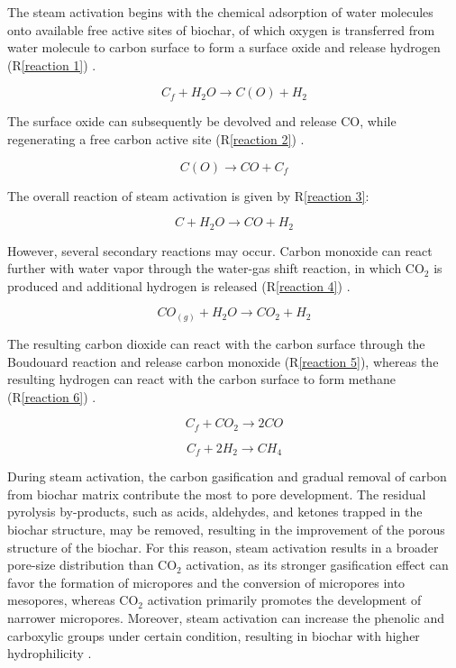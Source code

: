 The steam activation begins with the chemical adsorption of water molecules onto available free active sites of biochar, of which oxygen is transferred from water molecule to carbon surface to form a surface oxide and release hydrogen (R\ref{reaction 1}) \cite{Sajjadi2019}. 

\begin{equation}
C_f + H_2O \rightarrow C(O) + H_2
\label{reaction 1}
\end{equation}

The surface oxide can subsequently be devolved and release CO, while regenerating a free carbon active site (R\ref{reaction 2}) \cite{Sajjadi2019}.

\begin{equation}
C(O) \rightarrow CO + C_f
\label{reaction 2}
\end{equation}

The overall reaction of steam activation is given by R\ref{reaction 3}: 

\begin{equation}
C + H_2O \rightarrow CO + H_2
\label{reaction 3}
\end{equation}

However, several secondary reactions may occur. Carbon monoxide can react further with water vapor through the water-gas shift reaction, in which CO$_2$ is produced and additional hydrogen is released (R\ref{reaction 4}) \cite{Sajjadi2019}. 

\begin{equation}
CO_{(g)} + H_2O \rightarrow CO_2 + H_2
\label{reaction 4}
\end{equation}

The resulting carbon dioxide can react with the carbon surface through the Boudouard reaction and release carbon monoxide (R\ref{reaction 5}), whereas the resulting hydrogen can react with the carbon surface to form methane (R\ref{reaction 6}) \cite{Sajjadi2019}. 

\begin{equation}
C_f + CO_2 \rightarrow 2CO
\label{reaction 5}
\end{equation}

\begin{equation}
C_f + 2H_2 \rightarrow CH_4
\label{reaction 6}
\end{equation}


During steam activation, the carbon gasification and gradual removal of carbon from biochar matrix contribute the most to pore development. The residual pyrolysis by-products, such as acids, aldehydes, and ketones trapped in the biochar structure, may be removed, resulting in the improvement of the porous structure of the biochar. For this reason, steam activation results in a broader pore-size distribution than CO$_2$ activation, as its stronger gasification effect can favor the formation of micropores and the conversion of micropores into mesopores, whereas CO$_2$ activation primarily promotes the development of narrower micropores. Moreover, steam activation can increase the phenolic and carboxylic groups under certain condition, resulting in biochar with higher hydrophilicity \cite{Sajjadi2019}.  

